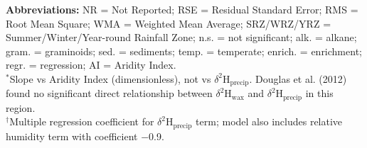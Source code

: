 \documentclass[11pt]{article}
\begin{document}
\begin{longtable}{@{}p{3.5cm}p{3.2cm}p{3.5cm}p{1.5cm}p{1.5cm}p{0.8cm}p{0.9cm}p{1.3cm}p{3.8cm}@{}}
\end{longtable}

\begin{flushleft}
\scriptsize
\textbf{Abbreviations:} NR = Not Reported; RSE = Residual Standard Error; RMS = Root Mean Square; WMA = Weighted Mean Average; SRZ/WRZ/YRZ = Summer/Winter/Year-round Rainfall Zone; n.s. = not significant; alk. = alkane; gram. = graminoids; sed. = sediments; temp. = temperate; enrich. = enrichment; regr. = regression; AI = Aridity Index. \\[0.5em]
$^*$Slope vs Aridity Index (dimensionless), not vs $\delta^2$H$_{\text{precip}}$. Douglas et al. (2012) found no significant direct relationship between $\delta^2$H$_{\text{wax}}$ and $\delta^2$H$_{\text{precip}}$ in this region. \\[0.5em]
$^\dagger$Multiple regression coefficient for $\delta^2$H$_{\text{precip}}$ term; model also includes relative humidity term with coefficient $-$0.9.
\end{flushleft}
\end{document}
